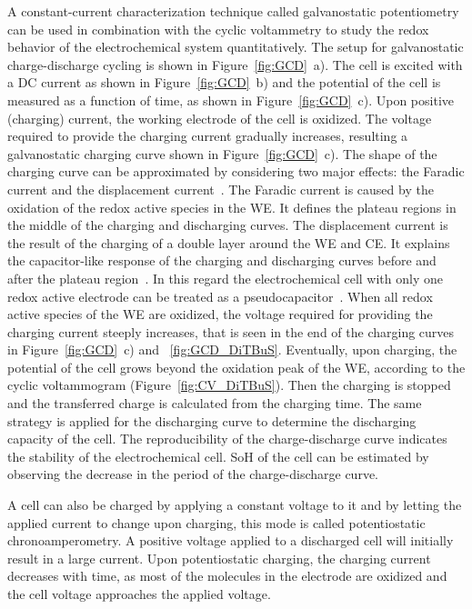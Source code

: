 A constant-current characterization technique called galvanostatic potentiometry~\cite{Bard_book} can be used in combination with the cyclic voltammetry to study the redox behavior of the electrochemical system quantitatively. The setup for galvanostatic charge-discharge cycling is shown in Figure~\ref{fig:GCD}~a). The cell is excited with a DC current as shown in Figure~\ref{fig:GCD}~b) and the potential of the cell is measured as a function of time, as shown in Figure~\ref{fig:GCD}~c). Upon positive (charging) current, the working electrode of the cell is oxidized. The voltage required to provide the charging current gradually increases, resulting a galvanostatic charging curve shown in Figure~\ref{fig:GCD}~c). The shape of the charging curve can be approximated by considering two major effects: the Faradic current and the displacement current~\cite{Bard_book}. The Faradic current is caused by the oxidation of the redox active species in the WE. It defines the plateau regions in the middle of the charging and discharging curves. The displacement current is the result of the charging of a double layer around the WE and CE. It explains the capacitor-like response of the charging and discharging curves before and after the plateau region~\cite{Bard_book}. In this regard the electrochemical cell with only one redox active electrode can be treated as a pseudocapacitor~\cite{He_2022,Vereshchagin2022}. When all redox active species of the WE are oxidized, the voltage required for providing the charging current steeply increases, that is seen in the end of the charging curves in Figure~\ref{fig:GCD}~c) and ~\ref{fig:GCD_DiTBuS}. Eventually, upon charging, the potential of the cell grows beyond the oxidation peak of the WE, according to the cyclic voltammogram (Figure~\ref{fig:CV_DiTBuS}). Then the charging is stopped and the transferred charge is calculated from the charging time. The same strategy is applied for the discharging curve to determine the discharging capacity of the cell. The reproducibility of the charge-discharge curve indicates the stability of the electrochemical cell. SoH of the cell can be estimated by observing the decrease in the period of the charge-discharge curve.\\

\par
A cell can also be charged by applying a constant voltage to it and by letting the applied current to change upon charging, this mode is called potentiostatic chronoamperometry. A positive voltage applied to a discharged cell will initially result in a large current. Upon potentiostatic charging, the charging current decreases with time, as most of the molecules in the electrode are oxidized and the cell voltage approaches the applied voltage.





